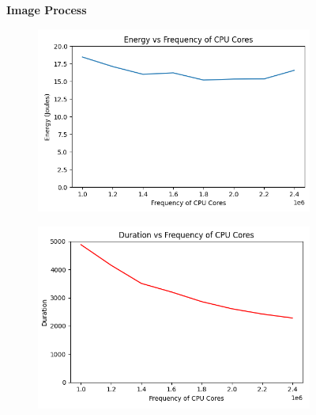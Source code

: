 \documentclass[times, 10pt,twocolumn]{article}
\begin{document}
\begin{figure}[ht]
   \textbf{Image Process}\par\medskip
   \begin{subfigure}[b]{0.45\textwidth}
      \includegraphics[width=\textwidth]{imgs/study_1_results/var_freq/imageprocess/Freq_Energy.png}
     \caption{}
     \label{fig:plot12}
   \end{subfigure}
   \hfill
   \begin{subfigure}[b]{0.45\textwidth}
      \includegraphics[width=\textwidth]{imgs/study_1_results/var_freq/imageprocess/Freq_Duration.png}
     \caption{}
     \label{fig:plot13}
   \end{subfigure}
   

\end{figure}
\end{document}

